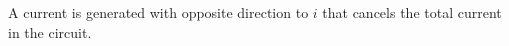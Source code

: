 A current is generated with opposite direction to $i$ %
that cancels the total current in the circuit.